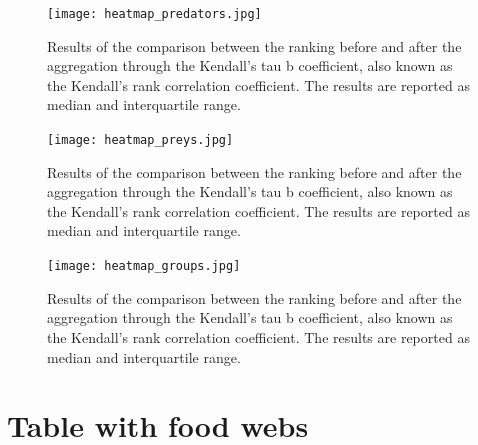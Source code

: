 \documentclass[twocolumn]{article}
\begin{document}
\begin{appendices}
		\begin{figure}[b]%
			\centering
			\texttt{[image: heatmap\_predators.jpg]}
			\caption{Results of the comparison between the ranking before and after the aggregation through the Kendall's tau b coefficient, also known as the Kendall's rank correlation coefficient. The results are reported as median and interquartile range.} \label{fig:predators_results}
		\end{figure}

		\begin{figure}[b]%
			\centering
			\texttt{[image: heatmap\_preys.jpg]}
			\caption{Results of the comparison between the ranking before and after the aggregation through the Kendall's tau b coefficient, also known as the Kendall's rank correlation coefficient. The results are reported as median and interquartile range.} \label{fig:preys_results}
		\end{figure}

		\begin{figure}[b]%
			\centering
			\texttt{[image: heatmap\_groups.jpg]}
			\caption{Results of the comparison between the ranking before and after the aggregation through the Kendall's tau b coefficient, also known as the Kendall's rank correlation coefficient. The results are reported as median and interquartile range.} \label{fig:groups_results}
		\end{figure}


	\section{Table with food webs} \label{appendix:food_webs}


\end{appendices}
\end{document}
